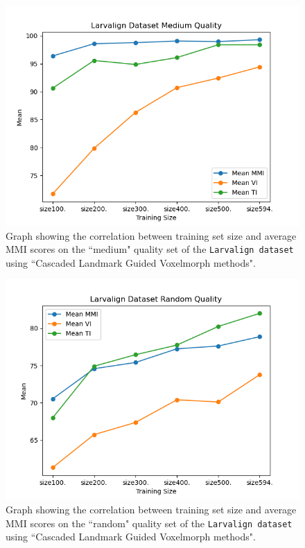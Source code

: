 \documentclass{book}
\begin{document}
	\begin{figure}[h!]
		\centering
		\includegraphics[width=0.9\columnwidth]{resources/ablation_size/size_effect_medium.png}
		\caption{Graph showing the correlation between training set size and average MMI scores on the ``medium" quality set of the \texttt{Larvalign dataset} using ``Cascaded Landmark Guided Voxelmorph methods".}
		\label{fig:size_effect_medium}
	\end{figure}

	\begin{figure}[h!]
		\centering
		\includegraphics[width=0.9\columnwidth]{resources/ablation_size/size_effect_random.png}
		\caption{Graph showing the correlation between training set size and average MMI scores on the ``random" quality set of the \texttt{Larvalign dataset} using ``Cascaded Landmark Guided Voxelmorph methods".}
		\label{fig:size_effect_random}
	\end{figure}
	
\end{document}
